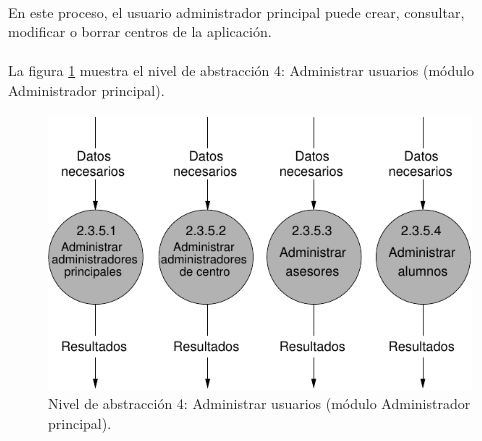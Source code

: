 \paragraph{}En este proceso, el usuario administrador principal puede crear,
consultar, modificar o borrar centros de la aplicación.

\paragraph{}La figura \ref{diagramaNivel4-AdministrarUsuarios}
muestra el nivel de abstracción 4: Administrar usuarios (módulo Administrador
principal).

  \begin{figure}[!ht]
    \begin{center}
      \includegraphics[]{08.Analisis_Funcional/8.2.DFDs/Niveles/Nivel4/AdministradorPrincipal/AdministrarUsuarios/Diagramas/nivel4-AdministrarUsuarios.pdf}
      \caption{Nivel de abstracción 4: Administrar usuarios (módulo Administrador
principal).}
      \label{diagramaNivel4-AdministrarUsuarios}
    \end{center}
  \end{figure}
